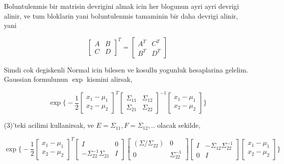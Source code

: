 \documentclass[12pt,fleqn]{article}\usepackage{../common}
\begin{document}
Boluntulenmis bir matrisin devrigini almak icin her blogunun ayri ayri devrigi
alinir, ve tum bloklarin yani boluntulenmis tamaminin bir daha devrigi
alinir, yani

\[ 
\left[\begin{array}{rr}
A & B \\ C & D 
\end{array}\right]^T = 
\left[\begin{array}{rr}
A^T & C^T \\ B^T & D^T
\end{array}\right]
 \]

Simdi cok degiskenli Normal icin bilesen ve kosullu yogunluk hesaplarina
gelelim. Gaussian formulunun $\exp$ kismini alirsak, 

\[ \exp 
\bigg\{ 
-\frac{ 1}{2}
\left[\begin{array}{r}
x_1 - \mu_1\\
x_2 - \mu_2
\end{array}\right]^T
\left[\begin{array}{rr}
\Sigma_{11} & \Sigma_{12}\\
\Sigma_{21} & \Sigma_{22}
\end{array}\right]^{-1}
\left[\begin{array}{r}
x_1 - \mu_1\\
x_2 - \mu_2
\end{array}\right]
\bigg\}
 \]


(3)'teki acilimi kullanirsak, ve $E = \Sigma_{11},F=\Sigma_{12},..$ olacak sekilde,

\[ \exp 
\bigg\{ 
-\frac{ 1}{2}
\left[\begin{array}{r}
x_1 - \mu_1\\
x_2 - \mu_2
\end{array}\right]^T
\left[\begin{array}{rr}
I & 0 \\ 
-\Sigma_{22}^{-1}\Sigma_{21} & I
\end{array}\right]
\left[\begin{array}{rr}
(\Sigma/\Sigma_{22}) & 0 \\ 
0 & \Sigma_{22}^{-1} 
\end{array}\right]
\left[\begin{array}{rr}
I & -\Sigma_{12}\Sigma_{22}^{-1}  \\ 
0 & I
\end{array}\right]
\left[\begin{array}{r}
x_1 - \mu_1\\
x_2 - \mu_2
\end{array}\right]
\bigg\}
 \]
\end{document}
